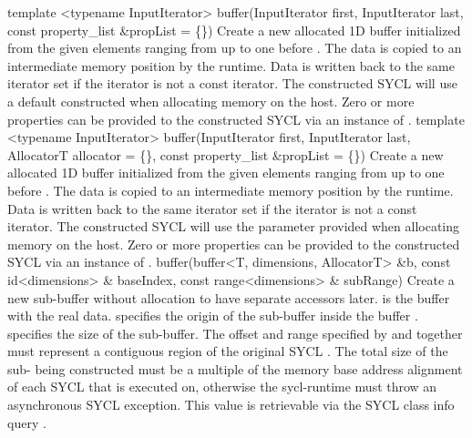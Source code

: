   \addRowThreeSL
    { template <typename InputIterator> }
    { buffer(InputIterator first, InputIterator last, }
    { const property_list \&propList = \{\}) }
    {
      Create a new allocated 1D buffer initialized from the given elements
      ranging from  up to one before .
      The data is copied to an intermediate memory position by the runtime.
      Data is written back to the same iterator set if the iterator is not
      a const iterator.
      The constructed SYCL  will use a default constructed  when allocating memory on the host.
      Zero or more properties can be provided to the constructed SYCL  via an instance of .
    }
  \addRowFourSL
    { template <typename InputIterator> }
    { buffer(InputIterator first, InputIterator last, }
    { AllocatorT allocator = \{\}, }
    { const property_list \&propList = \{\}) }
    {
      Create a new allocated 1D buffer initialized from the given elements
      ranging from  up to one before .
      The data is copied to an intermediate memory position by the runtime.
      Data is written back to the same iterator set if the iterator is not
      a const iterator.
      The constructed SYCL  will use the  parameter provided when allocating memory on the host.
      Zero or more properties can be provided to the constructed SYCL  via an instance of .
    }
  \addRowThreeSL
    { buffer(buffer<T, dimensions, AllocatorT> \&b, }
    { const id<dimensions> \& baseIndex, }
    { const range<dimensions> \& subRange) }
    {
      Create a new sub-buffer without allocation to have separate
      accessors later.  is the buffer with the real data.
       specifies the origin of the sub-buffer inside the
      buffer .  specifies the size of the sub-buffer.
      The offset and range specified by  and  together must represent a contiguous region of the original SYCL .
      The total size of the sub- being constructed must be a multiple of the memory base address alignment of each SYCL  that is executed on, otherwise the \gls{sycl-runtime} must throw an asynchronous  SYCL exception.
      This value is retrievable via the SYCL  class info query .
    }
